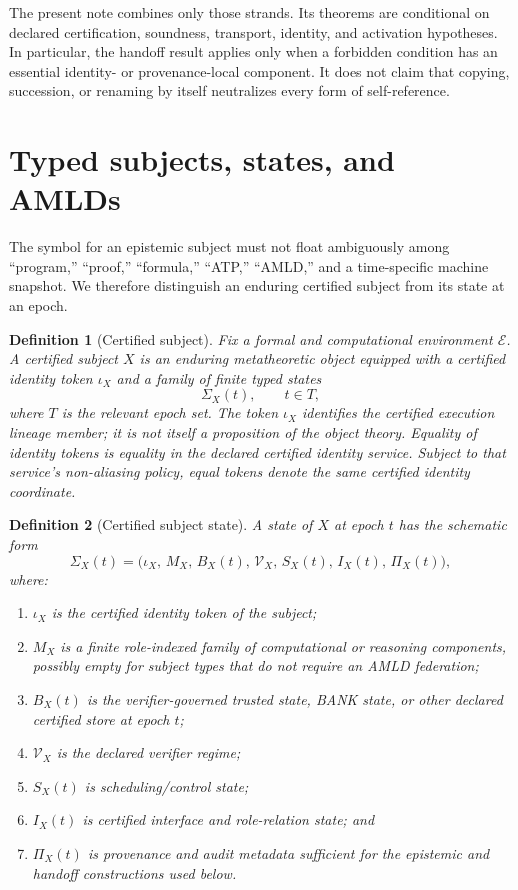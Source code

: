 \documentclass[11pt]{article}
\newtheorem{definition}{Definition}[section]
\theoremstyle{remark}
\begin{document}
The present note combines only those strands. Its theorems are conditional on declared certification, soundness, transport, identity, and activation hypotheses. In particular, the handoff result applies only when a forbidden condition has an essential identity- or provenance-local component. It does not claim that copying, succession, or renaming by itself neutralizes every form of self-reference.

\section{Typed subjects, states, and AMLDs}

The symbol for an epistemic subject must not float ambiguously among ``program,'' ``proof,'' ``formula,'' ``ATP,'' ``AMLD,'' and a time-specific machine snapshot. We therefore distinguish an enduring certified subject from its state at an epoch.

\begin{definition}[Certified subject]
Fix a formal and computational environment $\mathcal E$. A \emph{certified subject} $X$ is an enduring metatheoretic object equipped with a certified identity token $\iota_X$ and a family of finite typed states
\[
\Sigma_X(t), \qquad t\in T,
\]
where $T$ is the relevant epoch set. The token $\iota_X$ identifies the certified execution lineage member; it is not itself a proposition of the object theory. Equality of identity tokens is equality in the declared certified identity service. Subject to that service's non-aliasing policy, equal tokens denote the same certified identity coordinate.
\end{definition}

\begin{definition}[Certified subject state]
A state of $X$ at epoch $t$ has the schematic form
\[
\Sigma_X(t)=\bigl(\iota_X,\,M_X,\,B_X(t),\,\mathcal V_X,\,S_X(t),\,I_X(t),\,\Pi_X(t)\bigr),
\]
where:
\begin{enumerate}[label=(\alph*)]
\item $\iota_X$ is the certified identity token of the subject;
\item $M_X$ is a finite role-indexed family of computational or reasoning components, possibly empty for subject types that do not require an AMLD federation;
\item $B_X(t)$ is the verifier-governed trusted state, BANK state, or other declared certified store at epoch $t$;
\item $\mathcal V_X$ is the declared verifier regime;
\item $S_X(t)$ is scheduling/control state;
\item $I_X(t)$ is certified interface and role-relation state; and
\item $\Pi_X(t)$ is provenance and audit metadata sufficient for the epistemic and handoff constructions used below.
\end{enumerate}
\end{definition}
\end{document}
